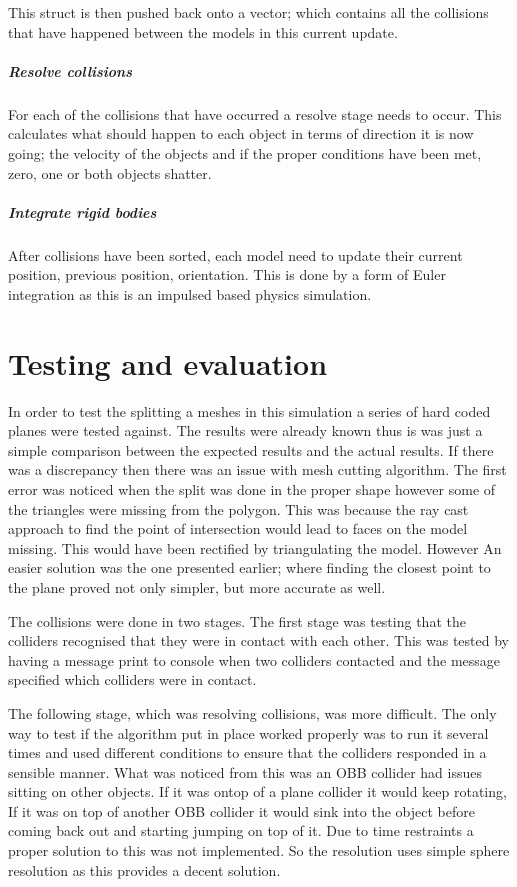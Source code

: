 \documentclass[conference,backref=page]{acmsiggraph}
\begin{document}
This struct is then pushed back onto a vector; which contains all the collisions that have happened between the models in this current update.
\subparagraph{Resolve collisions}\hfill

For each of the collisions that have occurred a resolve stage needs to occur. This calculates what should happen to each object in terms of direction it is now going; the velocity of the objects and if the proper conditions have been met, zero, one or both objects shatter.
\subparagraph{Integrate rigid bodies}\hfill

After collisions have been sorted, each model need to update their current position, previous position, orientation. This is done by a form of Euler integration as this is an impulsed based physics simulation.

\section{Testing and evaluation}

In order to test the splitting a meshes in this simulation a series of hard coded planes were tested against. The results were already known thus is was just a simple comparison between the expected results and the actual results. If there was a discrepancy then there was an issue with mesh cutting algorithm. The first error was noticed when the split was done in the proper shape however some of the triangles were missing from the polygon. This was because the ray cast approach to find the point of intersection would lead to faces on the model missing. This would have been rectified by triangulating the model. However An easier solution was the one presented earlier; where finding the closest point to the plane proved not only simpler, but more accurate as well.

The collisions were done in two stages. The first stage was testing that the colliders recognised that they were in contact with each other. This was tested by having a message print to console when two colliders contacted and the message specified which colliders were in contact. 

The following stage, which was resolving collisions, was more difficult. The only way to test if the algorithm put in place worked properly was to run it several times and used different conditions to ensure that the colliders responded in a sensible manner. What was noticed from this was an OBB collider had issues sitting on other objects. If it was ontop of a plane collider it would keep rotating, If it was on top of another OBB collider it would sink into the object before coming back out and starting jumping on top of it. Due to time restraints a proper solution to this was not implemented. So the resolution uses simple sphere resolution as this provides a decent solution.
\end{document}

